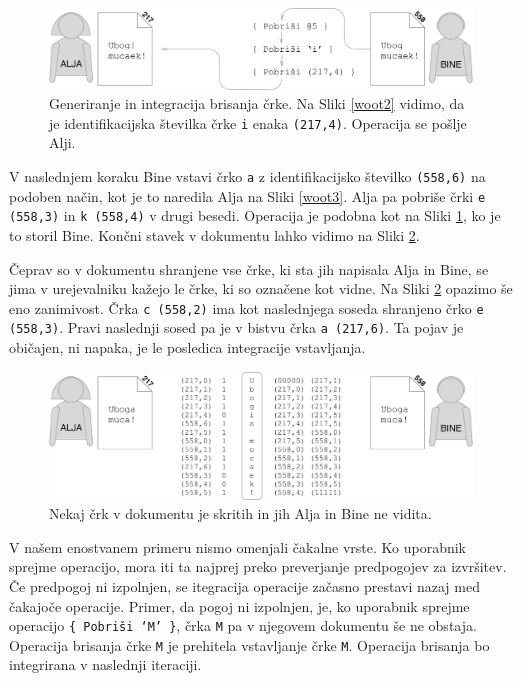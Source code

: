 \documentclass[a4paper, 12pt, twoside]{book}
\begin{document}
\begin{figure}[placement h]
\begin{center}
\includegraphics[width=16cm]{img/woot4.pdf}
\end{center}
\caption{Generiranje in integracija brisanja črke. Na Sliki \ref{woot2} vidimo, da je identifikacijska številka črke {\tt i} enaka {\tt (217,4)}. Operacija se pošlje Alji.}
\label{woot4}
\end{figure}

V naslednjem koraku Bine vstavi črko {\tt a} z identifikacijsko številko {\tt (558,6)} na podoben način, kot je to naredila Alja na Sliki \ref{woot3}. Alja pa pobriše črki {\tt e (558,3)} in {\tt k (558,4)} v drugi besedi. Operacija je podobna kot na Sliki \ref{woot4}, ko je to storil Bine. Končni stavek v dokumentu lahko vidimo na Sliki \ref{woot5}.

Čeprav so v dokumentu shranjene vse črke, ki sta jih napisala Alja in Bine, se jima v urejevalniku kažejo le črke, ki so označene kot vidne. Na Sliki \ref{woot5} opazimo še eno zanimivost. Črka {\tt c (558,2)} ima kot naslednjega soseda shranjeno črko {\tt e (558,3)}. Pravi naslednji sosed pa je v bistvu črka {\tt a (217,6)}. Ta pojav je običajen, ni napaka, je le posledica integracije vstavljanja.

\begin{figure}[placement h]
\begin{center}
\includegraphics[width=16cm]{img/woot5.pdf}
\end{center}
\caption{Nekaj črk v dokumentu je skritih in jih Alja in Bine ne vidita.}
\label{woot5}
\end{figure}

V našem enostvanem primeru nismo omenjali čakalne vrste. Ko uporabnik sprejme operacijo, mora iti ta najprej preko preverjanje predpogojev za izvršitev. Če predpogoj ni izpolnjen, se itegracija operacije začasno prestavi nazaj med čakajoče operacije. Primer, da pogoj ni izpolnjen, je, ko uporabnik sprejme operacijo {\tt \{ Pobriši ‘M’ \}}, črka {\tt M} pa v njegovem dokumentu še ne obstaja. Operacija brisanja črke {\tt M} je prehitela vstavljanje črke {\tt M}. Operacija brisanja bo integrirana v naslednji iteraciji.
\end{document}
